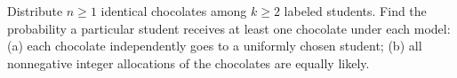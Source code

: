 Distribute $n\ge1$ identical chocolates among $k\ge2$ labeled students. Find the probability a particular student receives at least one chocolate under each model: (a) each chocolate independently goes to a uniformly chosen student; (b) all nonnegative integer allocations of the chocolates are equally likely.
